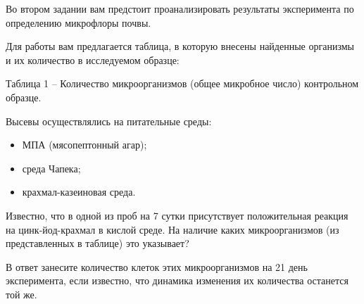 
Во втором задании вам предстоит проанализировать результаты эксперимента по определению микрофлоры почвы.

Для работы вам предлагается таблица, в которую внесены найденные организмы и их количество в исследуемом образце:

Таблица 1 – Количество микроорганизмов (общее микробное число) контрольном образце.


Высевы осуществлялись на питательные среды:

\begin{itemize}
    \item МПА (мясопептонный агар);
    \item среда Чапека;
    \item крахмал-казеиновая среда.
\end{itemize}

Известно, что в одной из проб на 7 сутки присутствует положительная реакция на цинк-йод-крахмал в кислой среде. На наличие каких микроорганизмов (из представленных в таблице) это указывает?

В ответ занесите количество клеток этих микроорганизмов на 21 день эксперимента, если известно, что динамика изменения их количества останется той же.